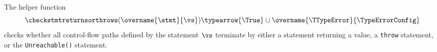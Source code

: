 \FormallyParagraph
\begin{mathpar}
\end{mathpar}

\begin{mathpar}
\end{mathpar}
   
   

\hypertarget{def-checkstmtreturnsorthrows}{}
The helper function
\[
  \checkstmtreturnsorthrows(\overname{\stmt}{\vs})
  \typearrow \{\True\} \cup \overname{\TTypeError}{\TypeErrorConfig}
\]
checks whether all control-flow paths defined by the statement $\vs$ terminate by either
a statement returning a value, a \texttt{throw} statement, or the \texttt{Unreachable()} statement.

